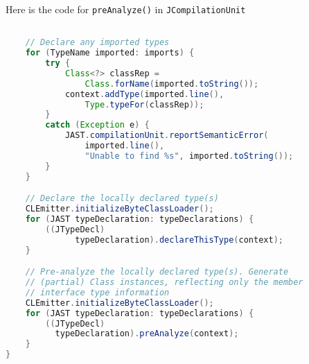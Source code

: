 \documentclass[8pt,a4paper,compress]{beamer}
\begin{document}
\begin{frame}[fragile]
\pause

Here is the code for \lstinline{preAnalyze()} in \lstinline{JCompilationUnit}
\begin{lstlisting}[language=Java,style=focusin]

    // Declare any imported types
    for (TypeName imported: imports) {
        try {
            Class<?> classRep =
                Class.forName(imported.toString());
            context.addType(imported.line(),
                Type.typeFor(classRep));
        }
        catch (Exception e) {
            JAST.compilationUnit.reportSemanticError(
                imported.line(),
                "Unable to find %s", imported.toString());                      
        }
    }

    // Declare the locally declared type(s)
    CLEmitter.initializeByteClassLoader();
    for (JAST typeDeclaration: typeDeclarations) {
        ((JTypeDecl)
              typeDeclaration).declareThisType(context);
    }

    // Pre-analyze the locally declared type(s). Generate
    // (partial) Class instances, reflecting only the member
    // interface type information
    CLEmitter.initializeByteClassLoader();
    for (JAST typeDeclaration: typeDeclarations) {
        ((JTypeDecl)
          typeDeclaration).preAnalyze(context);
    }
}
\end{lstlisting}
\end{frame}
\end{document}
